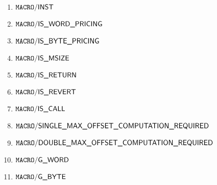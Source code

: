 \begin{enumerate}
	\item $\mxpDecoderInst$
	\item $\mxpDecoderIsWordPricing$
	\item $\mxpDecoderIsBytePricing$
	\item $\mxpDecoderIsMsize$
	\item $\mxpDecoderIsReturn$
	\item $\mxpDecoderIsRevert$
	\item $\mxpDecoderIsCall$
	\item $\mxpDecoderSingleMaxOffsetComputationRequired$
	\item $\mxpDecoderDoubleMaxOffsetComputationRequired$
	\item $\mxpDecoderGWord$
	\item $\mxpDecoderGByte$
\end{enumerate}
